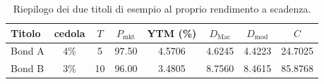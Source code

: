 \begin{table}[H]\centering\small
\caption{Riepilogo dei due titoli di esempio al proprio rendimento a scadenza.}
\label{tab:riepilogo-duration}\renewcommand{\arraystretch}{1.15}
\begin{tabular}{lccccccc}
\toprule
Titolo & cedola & $T$ & $P_{\mathrm{mkt}}$ & YTM (\%) & $D_{\mathrm{Mac}}$ & $D_{\mathrm{mod}}$ & $C$\\
\midrule
\rowcolor{rowtint}Bond A & 4\% & 5 & 97.50 & 4.5706 & 4.6245 & 4.4223 & 24.7025\\
Bond B & 3\% & 10 & 96.00 & 3.4805 & 8.7560 & 8.4615 & 85.8768\\
\bottomrule
\end{tabular}
\end{table}
